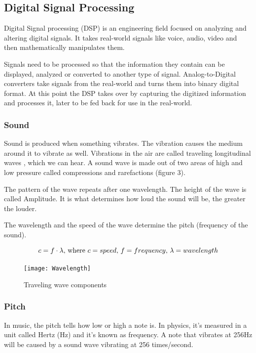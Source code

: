 \subsection{Digital Signal Processing}
Digital Signal processing (DSP) is an engineering field focused on analyzing and altering digital signals. It takes real-world signals like voice, audio, video and then mathematically manipulates them. \cite{dsp} \par

Signals need to be processed so that the information they contain can be displayed, analyzed or converted to another type of signal. Analog-to-Digital converters take signals from the real-world and turns them into binary digital format. At this point the DSP takes over by capturing the digitized information and processes it, later to be fed back for use in the real-world. \par

\subsubsection{Sound}
\par
Sound is produced when something vibrates. The vibration causes the medium around it to vibrate as well. Vibrations in the air are called traveling longitudinal waves \cite{physics_of_sound}, which we can hear.
A sound wave is made out of two areas of high and low pressure called compressions and rarefactions (figure 3). \par

The pattern of the wave repeats after one wavelength. The height of the wave is called Amplitude. It is what determines how loud the sound will be, the greater the louder.

The wavelength and the speed of the wave determine the pitch (frequency of the sound). \par 


\begin{equation}
c = f \cdot \lambda \textnormal{, where $c=speed$, $f=frequency$, $\lambda=wavelength$}
\end{equation}

\begin{figure}[h]
	\caption[Traveling Wave]{
		Traveling wave components \cite{traveling_wave} }
	\centering
	\texttt{[image: Wavelength]}
\end{figure}

\subsubsection{Pitch}
In music, the pitch tells how low or high a note is. In physics, it's measured in a unit called Hertz (Hz) and it's known as frequency. A note that vibrates at 256Hz will be caused by a sound wave vibrating at 256 times/second. \par

